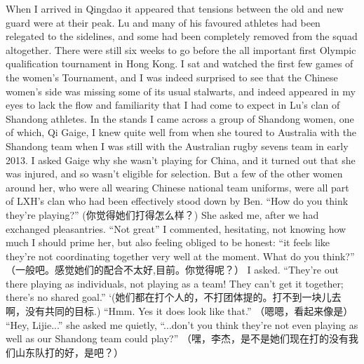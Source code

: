 When I arrived in Qingdao it appeared that tensions between the old and new guard were at their peak.  Lu and many of his favoured athletes had been relegated to the sidelines, and some had been completely removed from the squad altogether.  There were still six weeks to go before the all important first Olympic qualification tournament in Hong Kong.  I sat and watched the first few games of the women's Tournament, and I was indeed surprised to see that the Chinese women's side was missing some of its usual stalwarts, and indeed appeared in my eyes to lack the flow and familiarity that I had come to expect in Lu's clan of Shandong athletes.  In the stands I came across a group of Shandong women, one of which, Qi Gaige, I knew quite well from when she toured to Australia with the Shandong team when I was still with the Australian rugby sevens team in early 2013.  I asked Gaige why she wasn't playing for China, and it turned out that she was injured, and so wasn't eligible for selection.  But a few of the other women around her, who were all wearing Chinese national team uniforms, were all part of LXH's clan who had been effectively stood down by Ben. ``How do you think they're playing?'' (你觉得她们打得怎么样？) She asked me, after we had exchanged pleasantries. ``Not great'' I commented, hesitating, not knowing how much I should prime her, but also feeling obliged to be honest: ``it feels like they’re not coordinating together very well at the moment.  What do you think?'' （一般吧。感觉她们的配合不太好,目前。你觉得呢？） I asked.  ``They’re out there playing as individuals, not playing as a team! They can't get it together; there's no shared goal.'' `(她们都在打个人的，不打团体提的。打不到一块儿去啊，没有共同的目标.)  ``Hmm. Yes it does look like that.'' （嗯嗯，看起来像是） ``Hey, Lijie...'' she asked me quietly, ``...don’t you think they’re not even playing as well as our Shandong team could play?'' （嘿，李杰，是不是她们现在打的没有我们山东队打的好，是吧？）

